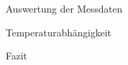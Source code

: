 \documentclass[pdftex, a4paper,11pt, twoside, ngerman]{report}
\begin{document}
\begin{chapter}{Auswertung der Messdaten}
\begin{section}{Temperaturabhängigkeit}
      
    \end{section}
    
    
    
    \newpage
    \begin{section}{Fazit}
      \label{chp:Fazit}
      
      
      
    \end{section}
    
  \end{chapter}
  
  
  
  
  
  
  
  \begin{thebibliography}{99}
    \scriptsize
    
  \end{thebibliography}
 
\end{document}
